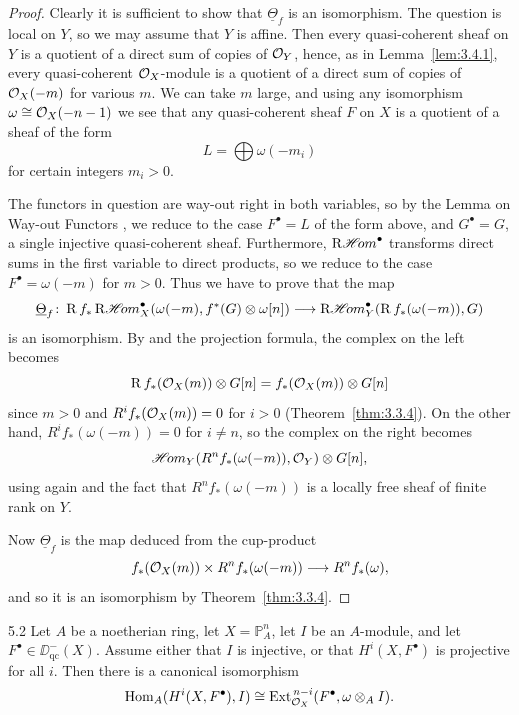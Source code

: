 \begin{proof}
Clearly it is sufficient to show that $\underline{\Theta}_f$ is an isomorphism. The question is local on $Y$, so we may assume that $Y$ is affine. Then every quasi-coherent sheaf on $Y$ is a quotient of a direct sum of copies of $\mathcal{O}_Y$, hence, as in Lemma~\ref{lem:3.4.1}, every quasi-coherent $\mathcal{O}_X$-module is a quotient of a direct sum of copies of $\mathcal{O}_X(-m)$ for various $m$. We can take $m$ large, and using any isomorphism $\omega\cong\mathcal{O}_X(-n-1)$ we see that any quasi-coherent sheaf $F$ on $X$ is a quotient of a sheaf of the form
\[
L = \bigoplus \omega(-m_i)
\]
for certain integers $m_i>0$.

The functors in question are way-out right in both variables, so by the Lemma on Way-out Functors , we reduce to the case $F^\bullet=L$ of the form above, and $G^\bullet=G$, a single injective quasi-coherent sheaf. Furthermore, $\mathop{\mathrm{R}\mathscr{H}\!om}\nolimits^\bullet$ transforms direct sums in the first variable to direct products, so we reduce to the case $F^\bullet=\omega(-m)$ for $m>0$. Thus we have to prove that the map
\[
\underline{\Theta}_f \colon \operatorname{R} f_* \mathop{\mathrm{R}\mathscr{H}\!om}\nolimits_X^\bullet(\omega(-m), f^*(G)\otimes\omega[n]) \longrightarrow \mathop{\mathrm{R}\mathscr{H}\!om}\nolimits_Y^\bullet(\operatorname{R} f_*(\omega(-m)), G)
\]
is an isomorphism. By  and the projection formula, the complex on the left becomes
\[
\operatorname{R} f_*(\mathcal{O}_X(m))\otimes G[n] = f_*(\mathcal{O}_X(m))\otimes G[n]
\]
since $m>0$ and $R^i f_*(\mathcal{O}_X(m))=0$ for $i>0$ (Theorem~\ref{thm:3.3.4}). On the other hand, $R^i f_*(\omega(-m))=0$ for $i\neq n$, so the complex on the right becomes
\[
\mathop{\mathscr{H}\!om}\nolimits_Y(R^n f_*(\omega(-m)), \mathcal{O}_Y)\otimes G[n],
\]
using again  and the fact that $R^n f_*(\omega(-m))$ is a locally free sheaf of finite rank on $Y$.

Now $\underline{\Theta}_f$ is the map deduced from the cup-product
\[
f_*(\mathcal{O}_X(m)) \times R^n f_*(\omega(-m)) \longrightarrow R^n f_*(\omega),
\]
and so it is an isomorphism by Theorem~\ref{thm:3.3.4}.
\end{proof}

\begin{bookcorollary}{5.2}\label{cor:3.5.2}
Let $A$ be a noetherian ring, let $X=\mathbb{P}_A^n$, let $I$ be an $A$-module, and let $F^\bullet\in\DD_{\mathrm{qc}}^-(X)$. Assume either that $I$ is injective, or that $H^i(X,F^\bullet)$ is projective for all $i$. Then there is a canonical isomorphism
\[
\operatorname{Hom}_A(H^i(X,F^\bullet), I) \cong \operatorname{Ext}_{\mathcal{O}_X}^{\,n-i}(F^\bullet, \omega\otimes_A I).
\]
\end{bookcorollary}

